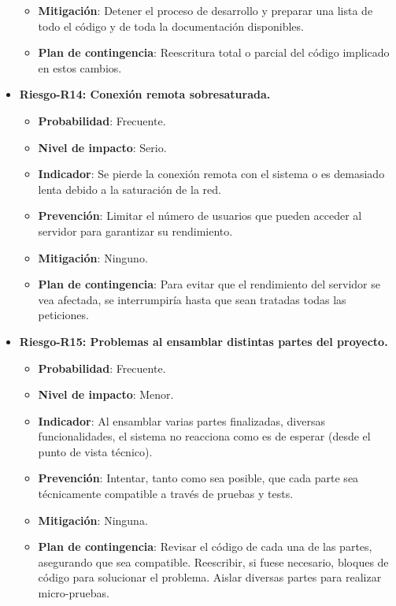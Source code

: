 \begin{itemize}
\begin{itemize}
		\item{ \bf Mitigación}: Detener el proceso de desarrollo y preparar una lista de todo el código y de toda la documentación disponibles.
		\item{ \bf Plan de contingencia}: Reescritura total o parcial del código implicado en estos cambios.\\
		\end{itemize}
\item { \bf Riesgo-R14: Conexión remota sobresaturada.}
		\begin{itemize}	
		\item{ \bf Probabilidad}: Frecuente.
		\item{ \bf Nivel de impacto}: Serio.
		\item{ \bf Indicador}: Se pierde la conexión remota con el sistema o es demasiado lenta debido a la saturación de la red.
		\item{ \bf Prevención}: Limitar el número de usuarios que pueden acceder al servidor para garantizar su rendimiento.
		\item{ \bf Mitigación}: Ninguno.
		\item{ \bf Plan de contingencia}: Para evitar que el rendimiento del servidor se vea afectada, se interrumpiría hasta que sean tratadas todas las peticiones.\\
		\end{itemize}
\item { \bf Riesgo-R15: Problemas al ensamblar distintas partes del proyecto.}
		\begin{itemize}	
		\item{ \bf Probabilidad}: Frecuente.
		\item{ \bf Nivel de impacto}: Menor.
		\item{ \bf Indicador}: Al ensamblar varias partes finalizadas, diversas funcionalidades, el sistema no reacciona como es de esperar (desde el punto de vista técnico).
		\item{ \bf Prevención}: Intentar, tanto como sea posible, que cada parte sea técnicamente compatible a través de pruebas y tests.
		\item{ \bf Mitigación}: Ninguna.
		\item{ \bf Plan de contingencia}: Revisar el código de cada una de las partes, asegurando que sea compatible. Reescribir, si fuese necesario, bloques de código para solucionar el problema. Aislar diversas partes para realizar micro-pruebas.\\
		\end{itemize}

\end{itemize}
